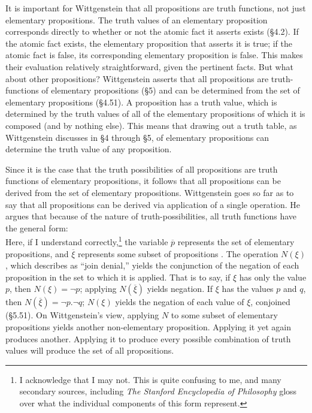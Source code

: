 \documentclass[12pt]{apa}
\begin{document}
It is important for Wittgenstein that all propositions are truth functions, not just elementary propositions. The truth values of an elementary proposition corresponds directly to whether or not the atomic fact it asserts exists (\S 4.2). If the atomic fact exists, the elementary proposition that asserts it is true; if the atomic fact is false, its corresponding elementary proposition is false. This makes their evaluation relatively straightforward, given the pertinent facts. But what about other propositions? Wittgenstein asserts that all propositions are truth-functions of elementary propositions (\S 5) and can be determined from the set of elementary propositions (\S 4.51). A proposition has a truth value, which is determined by the truth values of all of the elementary propositions of which it is composed (and by nothing else). This means that drawing out a truth table, as Wittgenstein discusses in \S 4 through \S 5, of elementary propositions can determine the truth value of any proposition.

Since it is the case that the truth possibilities of all propositions are truth functions of elementary propositions, it follows that all propositions can be derived from the set of elementary propositions. Wittgenstein goes so far as to say that all propositions can be derived via application of a single operation. He argues that because of the nature of truth-possibilities, all truth functions have the general form: 
\begin{equation}
	[ \overline{p}, \overline{\xi}, N(\overline{\xi}) ]
\end{equation}
Here, if I understand correctly,\footnote{I acknowledge that I may not. This is quite confusing to me, and many secondary sources, including \emph{The Stanford Encyclopedia of Philosophy} gloss over what the individual components of this form represent.} the variable $ \overline{p} $ represents the set of elementary propositions, and $ \overline{\xi} $ represents some subset of propositions \cite{Speaks07}. The operation $ N( \xi ) $, which  describes as ``join denial,'' yields the conjunction of the negation of each proposition in the set to which it is applied. That is to say, if $\xi$ has only the value $p$, then $N(\xi) = \neg p$; applying $N(\overline{\xi})$ yields negation. If $\xi$ has the values $p$ and $q$, then $N(\overline{\xi}) = \neg p. \neg q$; $N(\xi)$ yields the negation of each value of $\xi$, conjoined (\S 5.51). On Wittgenstein's view, applying $N$ to some subset of elementary propositions yields another non-elementary proposition. Applying it yet again produces another. Applying it to produce every possible combination of truth values will produce the set of all propositions.
\end{document}
